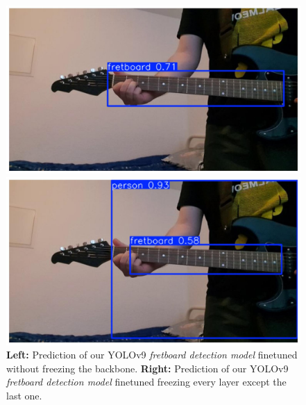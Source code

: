 \documentclass[10pt,twocolumn,letterpaper]{article}
\begin{document}
\begin{figure}[h]
    \begin{minipage}{0.45\textwidth}
        \centering
        \includegraphics[width=\textwidth]{images/interim/dhimitrios-non-frozen.jpg}
    \end{minipage}
    \hfill
    \begin{minipage}{0.45\textwidth}
        \centering
        \includegraphics[width=\textwidth]{images/interim/dhimitrios.jpg}
    \end{minipage}
    \caption{\textbf{Left:} Prediction of our YOLOv9 \emph{fretboard detection model} finetuned without freezing the backbone. \textbf{Right:} Prediction of our YOLOv9 \emph{fretboard detection model} finetuned freezing every layer except the last one.}
    \label{fig:dataset-example}
\end{figure}
\end{document}
